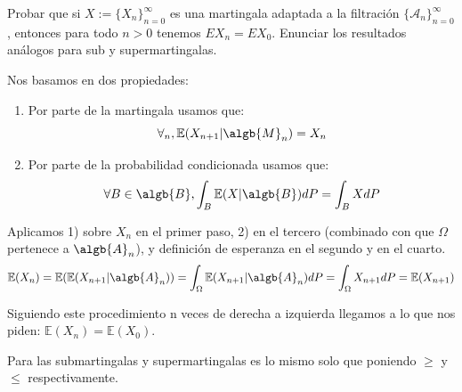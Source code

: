 \begin{problem}[4] Probar que si $X := \{X_n\}_{n=0}^{\infty}$  es una martingala adaptada a la filtraci\'on
$\{\mathcal{A}_n\}_{n=0}^{\infty}$, entonces para todo $n>0$ tenemos 
$EX_n = EX_0$. 
Enunciar los resultados an\'alogos para sub y supermartingalas.
\solution

\begin{expla}
Nos basamos en dos propiedades:
\begin{enumerate}
\item Por parte de la martingala usamos que:
$$\forall_n, \mathbb{E}(X_{n+1}|\algb{M}_n)=X_n$$
\item Por parte de la probabilidad condicionada usamos que:
$$\forall B \in \algb{B}, \int_{B}\mathbb{E}(X|\algb{B})dP=\int_{B}XdP$$
\end{enumerate}
\end{expla}
Aplicamos 1) sobre $X_n$ en el primer paso, 2) en el tercero (combinado con que $\Omega$ pertenece a $\algb{A}_n$), y definición de esperanza en el segundo y en el cuarto.
\[
\mathbb{E}(X_n) =\mathbb{E}(\mathbb{E}(X_{n+1}|\algb{A}_n)) = \int_{\Omega} \mathbb{E}(X_{n+1}|\algb{A}_n) dP = \int_{\Omega} X_{n+1}dP = \mathbb{E}(X_{n+1})
\]

Siguiendo este procedimiento n veces de derecha a izquierda llegamos a lo que nos piden: $\mathbb{E}(X_n) = \mathbb{E}(X_0)$.

Para las submartingalas y supermartingalas es lo mismo solo que poniendo $\geq$ y $\leq$ respectivamente.

\end{problem}


